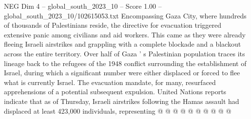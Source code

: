 \begin{textsample}{NEG Dim 4 – global\_south\_2023\_10 – Score 1.00 – global\_south\_2023\_10/102615053.txt}
Encompassing Gaza City, where hundreds of thousands of Palestinians reside, the directive for evacuation triggered extensive panic among civilians and aid workers.
This came as they were already fleeing Israeli airstrikes and grappling with a complete blockade and a blackout across the entire territory.
Over half of Gaza ' s Palestinian population traces its lineage back to the refugees of the 1948 conflict surrounding the establishment of Israel, during which a significant number were either displaced or forced to flee what is currently Israel.
The evacuation mandate, for many, resurfaced apprehensions of a potential subsequent expulsion.
United Nations reports indicate that as of Thursday, Israeli airstrikes following the Hamas assault had displaced at least 423,000 individuals, representing @ @ @ @ @ @ @ @ @ @

\end{textsample}

